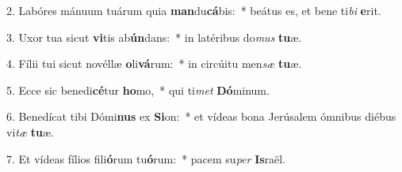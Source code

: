 2. Labóres mánuum tuárum quia \textbf{man}du\textbf{cá}bis:~*  beátus es, et bene ti\textit{bi} \textbf{e}rit.\

3. Uxor tua sicut \textbf{vi}tis ab\textbf{ún}dans:~*  in latéribus do\textit{mus} \textbf{tu}æ.\

4. Fílii tui sicut novéllæ \textbf{o}li\textbf{vá}rum:~*  in circúitu men\textit{sæ} \textbf{tu}æ.\

5. Ecce sic benedi\textbf{cé}tur \textbf{ho}mo,~*  qui ti\textit{met} \textbf{Dó}minum.\

6. Benedícat tibi Dómi\textbf{nus} ex \textbf{Si}on:~*  et vídeas bona Jerúsalem ómnibus diébus vi\textit{tæ} \textbf{tu}æ.\

7. Et vídeas fílios fili\textbf{ó}rum tu\textbf{ó}rum:~*  pacem su\textit{per} \textbf{Is}raël.\

